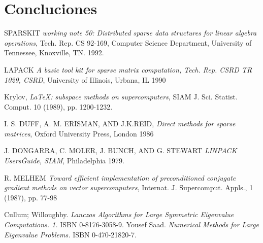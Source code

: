 \documentclass[a4paper,openright,12pt, oneside]{book}
\begin{document}
\setcounter{chapter}{6}
\setcounter{section}{0}
\chapter*{Concluciones}\label{Concluciones}
\markboth{}{} %


\begin{thebibliography}{X}

  SPARSKIT 
  \emph{working note 50: Distributed sparse data structures for linear algebra operations},
  Tech. Rep. CS 92-169, Computer Science Department, University of Tennessee, Knoxville, TN.
  1992.

  LAPACK 
  \emph{A basic tool kit for sparse matrix computation, Tech. Rep. CSRD TR 1029, CSRD},
  University of Illinois, Urbana, IL
  1990

  Krylov,
  \emph{\LaTeX: subspace methods on supercomputers},
  SIAM J. Sci. Statist. Comput.
  10 (1989), pp. 1200-1232.

  I. S. DUFF, A. M. ERISMAN, AND J.K.REID,
  \emph{Direct methods for sparse matrices},
  Oxford University Press, London
  1986

  J. DONGARRA, C. MOLER, J. BUNCH, AND G. STEWART
  \emph{LINPACK Users\' Guide, SIAM},
  Philadelphia
  1979.

  R. MELHEM
  \emph{Toward efficient implementation of preconditioned conjugate gradient methods on vector supercomputers},
  Internat. J. Supercomput. Appls., 1 (1987), pp. 77-98

  Cullum; Willoughby. 
  \emph{Lanczos Algorithms for Large Symmetric Eigenvalue Computations. 1.} 
  ISBN 0-8176-3058-9.
  Yousef Saad. 
  \emph{Numerical Methods for Large Eigenvalue Problems.} 
  ISBN 0-470-21820-7.

\end{thebibliography}
\end{document}
